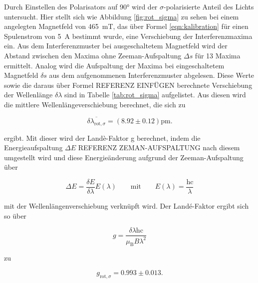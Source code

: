             \FloatBarrier

            Durch Einstellen des Polarisators auf 90° wird der $\sigma$-polarisierte Anteil des Lichts untersucht. Hier stellt sich wie Abbildung \ref{fig:rot_sigma} zu sehen bei einem angelegten Magnetfeld von 
            \SI{465}{\milli\tesla}, das über Formel \ref{eqn:kalibration} für einen Spulenstrom von \SI{5}{\ampere} bestimmt wurde, eine Verschiebung der Interferenzmaxima ein. Aus dem Interferenzmuster bei 
            ausgeschaltetem Magnetfeld wird der Abstand zwischen den Maxima ohne Zeeman-Aufspaltung $\Delta s$
            für 13 Maxima ermittelt. Analog wird die Aufspaltung der Maxima bei eingeschaltetem Magnetfeld $\delta s$ aus dem aufgenommenen Interferenzmuster abgelesen. Diese Werte sowie die daraus über Formel
            REFERENZ EINFÜGEN berechnete Verschiebung der Wellenlänge $\delta\lambda$ sind in Tabelle \ref{tab:rot_sigma} aufgelistet. Aus diesen wird die mittlere Wellenlängeverschiebung berechnet, die sich 
            zu

            \begin{equation*}
                \overline{\delta \lambda_{\text{rot}, \sigma}} = \left(8.92 \pm 0.12\right)\si{\pico\metre}.
            \end{equation*}

            ergibt. Mit dieser wird der Landè-Faktor g berechnet, indem die Energieaufspaltung $\Delta E$ REFERENZ ZEMAN-AUFSPALTUNG nach diesem umgestellt wird und diese Energieänderung aufgrund der 
            Zeeman-Aufspaltung über 

            \begin{equation*}
                \Delta E = \frac{\delta E}{\delta \lambda} E(\lambda) \qquad \text{mit} \qquad E(\lambda) = \frac{\text{hc}}{\lambda}
            \end{equation*}

            mit der Wellenlängenverschiebung verknüpft wird. Der Landé-Faktor ergibt sich so über
            
            \begin{equation}
              g = \frac{\delta\lambda\text{hc}}{\mu_{\text{B}}B\lambda^2}
              \label{eqn:Lande}
            \end{equation}
            
            zu

            \begin{equation*}
                g_{\text{rot}, \sigma} = 0.993 \pm 0.013 .
            \end{equation*}


